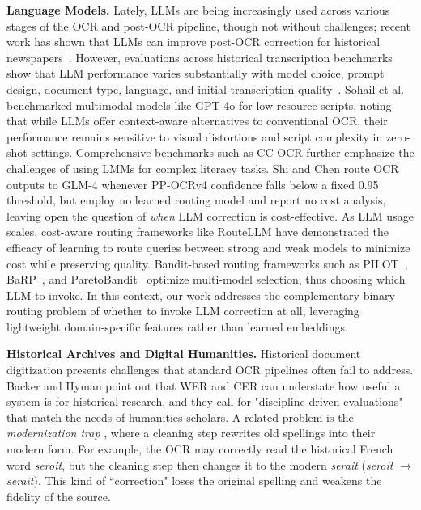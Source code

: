 \documentclass[sigconf]{acmart}
\begin{document}
\medskip\noindent\textbf{Language Models.}
Lately, LLMs are being increasingly used across various stages of the OCR and post-OCR pipeline, though not without challenges; recent work has shown that LLMs can improve post-OCR correction for historical newspapers~\cite{thomas2024leveraging}.
However, evaluations across historical transcription benchmarks show that LLM performance varies substantially with model choice, prompt design, document type, language, and initial transcription quality~\cite{boros2024post}.
Sohail et al. \cite{sohail2024decipheringunderservedbenchmarkingllm} benchmarked multimodal models like GPT-4o for low-resource scripts, noting that while LLMs offer context-aware alternatives to conventional OCR, their performance remains sensitive to visual distortions and script complexity in zero-shot settings. Comprehensive benchmarks such as CC-OCR \cite{yang2024ccocrcomprehensivechallengingocr} further emphasize the challenges of using LMMs for complex literacy tasks. Shi and Chen \cite{10.1117/12.3068186} route OCR outputs to GLM-4 whenever PP-OCRv4 confidence falls below a fixed 0.95 threshold, but employ no learned routing model and report no cost analysis, leaving open the question of \emph{when} LLM correction is cost-effective. As LLM usage scales, cost-aware routing frameworks like RouteLLM \cite{Ong2025RouteLLMLT, li2025costaware} have demonstrated the efficacy of learning to route queries between strong and weak models to minimize cost while preserving quality. Bandit-based routing frameworks such as PILOT~\cite{panda2025pilot}, BaRP~\cite{wang2025barp}, and ParetoBandit~\cite{tabernermiller2026paretobandit} optimize multi-model selection, thus choosing which LLM to invoke. 
In this context, our work addresses the complementary binary routing problem of whether to invoke LLM correction at all, leveraging lightweight domain-specific features rather than learned embeddings.

\medskip\noindent\textbf{Historical Archives and Digital Humanities.}
Historical document digitization presents challenges that standard OCR pipelines often fail to address. Backer and Hyman \cite{backer-hyman-2025-bootstrapping} point out that WER and CER can understate how useful a system is for historical research, and they call for "discipline-driven evaluations" that match the needs of humanities scholars. A related problem is the \emph{modernization trap} \cite{hammarstrom2025investigation}, where a cleaning step rewrites old spellings into their modern form. For example, the OCR may correctly read the historical French word \textit{seroit}, but the cleaning step then changes it to the modern \textit{serait} (\textit{seroit} $\rightarrow$ \textit{serait}). This kind of ``correction" loses the original spelling and weakens the fidelity of the source. 
\end{document}

